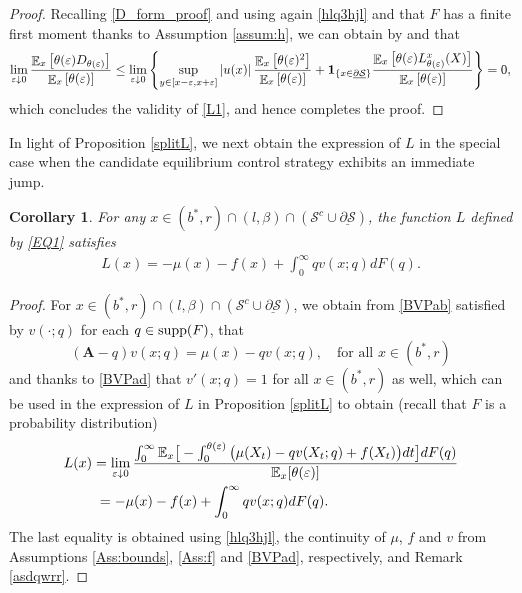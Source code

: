 \documentclass[11pt]{article} %
\newtheorem{corollary}[theorem]{Corollary}
\DeclareMathOperator{\E}{\mathbb E}
\numberwithin{komcounter}{section}
\renewcommand{\ul}{\underline}
\renewcommand{\epsilon}{\varepsilon}
\begin{document}
\begin{proof}
Recalling \eqref{D_form_proof} and using again \eqref{hlq3hjl} and that $F$ has a finite first moment thanks to Assumption \ref{assum:h}, we can obtain by \cite[Lemma 28]{bodnariu2022local} and \cite[Lemma A.5]{christensen2020time} that 
\begin{align*}
\lim_{\epsilon\downarrow 0} \frac{\E_x\left[\theta(\epsilon) D_{\theta(\epsilon)}\right]}{\E_x\left[\theta(\epsilon)\right]} \leq \lim_{\epsilon\downarrow 0} \left\{ \sup_{y\in [x-\epsilon,x+\epsilon]} |u(x)| \, \frac{\E_x\left[\theta(\epsilon)^2\right]}{\E_x\left[\theta(\epsilon)\right]} + {\bf 1}_{\{x \in \ul{\partial \mathcal{S}}\}} \frac{\E_x\big[\theta(\epsilon) L_{\theta(\epsilon)}^x(X) \big]}{\E_x\left[\theta(\epsilon)\right]} \right\} 
= 0 ,
\end{align*} 
which concludes the validity of \eqref{L1}, and hence completes the proof.
\end{proof}

In light of Proposition \ref{splitL}, we next obtain the expression of $L$ in the special case when the candidate equilibrium control strategy exhibits an immediate jump. 

\begin{corollary} \label{lemma_payoutmix} 
For any $x\in (b^*,r) \cap (l,\beta) \cap (\mathcal{S}^c \cup \ul{\partial \mathcal{S}})$, the function $L$ defined by \eqref{EQ1} satisfies 
\begin{align*}
L(x) = - \mu(x)-f(x)+\int_0^\infty q v(x;q) dF(q).
\end{align*}
\end{corollary} 
\begin{proof}
For $x \in (b^*,r) \cap (l,\beta) \cap (\mathcal{S}^c \cup \ul{\partial \mathcal{S}})$, we obtain from \eqref{BVPab} satisfied by $v(\cdot;q)$ for each $q \in {\rm supp}(F)$, that 
$$
(\textbf{A}-q)v(x;q) = \mu(x) - q v(x;q), \quad \text{for all } x\in(b^*,r)
$$ 
and thanks to \eqref{BVPad} that $v'(x;q)=1$ for all $x\in (b^*,r)$ as well, which can be used in the expression of $L$ in Proposition \ref{splitL} to obtain (recall that $F$ is a probability distribution) 
\begin{align*} 
L(x) 
&= \lim_{\epsilon\downarrow 0} \frac{\int_0^\infty \mathbb{E}_x\big[ - \int_0^{\theta(\epsilon)} 
\big(\mu(X_t) - q v(X_t;q) + f(X_t) \big) dt \big] dF(q)}{\mathbb{E}_x[\theta(\epsilon)]} \notag\\
&\; = -\mu(x)-f(x)+\int_0^\infty q v(x;q) dF(q).
\end{align*}
The last equality is obtained using \eqref{hlq3hjl}, the continuity of $\mu$, $f$ and $v$ from Assumptions \ref{Ass:bounds}, \ref{Ass:f} and \eqref{BVPad}, respectively, and Remark \ref{asdqwrr}.
\end{proof}
\end{document}
